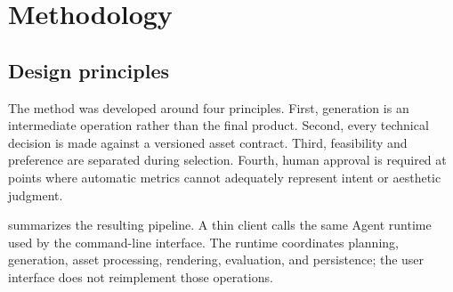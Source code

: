 \section{Methodology}
\label{sec:method}

\subsection{Design principles}

The method was developed around four principles. First, generation is an
intermediate operation rather than the final product. Second, every technical
decision is made against a versioned asset contract. Third, feasibility and
preference are separated during selection. Fourth, human approval is required at
points where automatic metrics cannot adequately represent intent or aesthetic
judgment.

 summarizes the resulting pipeline. A thin client calls the
same Agent runtime used by the command-line interface. The runtime coordinates
planning, generation, asset processing, rendering, evaluation, and persistence;
the user interface does not reimplement those operations.

